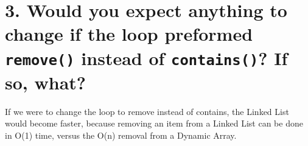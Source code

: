 \documentclass[letter,11pt]{scrartcl}
\begin{document}

\section*{3. Would you expect anything to change if the loop preformed
  \texttt{remove()} instead of \texttt{contains()}? If so, what?}

If we were to change the loop to remove instead of contains, the Linked List would become faster, because removing an item from a Linked List can be done in O(1) time, versus the O(n) removal from a Dynamic Array.

\end{document}

